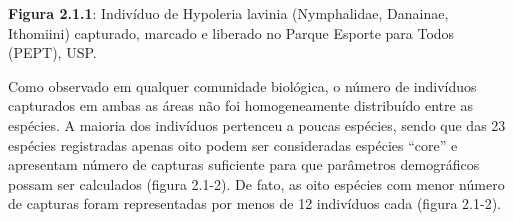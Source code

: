 \textbf{Figura 2.1.1}: Indivíduo de Hypoleria lavinia (Nymphalidae, Danainae, Ithomiini) capturado, marcado e liberado no Parque Esporte para Todos (PEPT), USP.

Como observado em qualquer comunidade biológica, o número de indivíduos capturados em ambas as áreas não foi homogeneamente distribuído entre as espécies. A maioria dos indivíduos pertenceu a poucas espécies, sendo que das 23 espécies registradas apenas oito podem ser consideradas espécies “core” e apresentam número de capturas suficiente para que parâmetros demográficos possam ser calculados (figura 2.1-2). De fato, as oito espécies com menor número de capturas foram representadas por menos de 12 indivíduos cada (figura 2.1-2).
